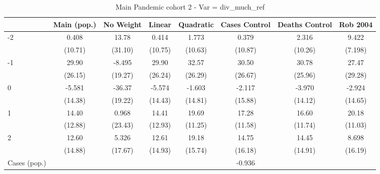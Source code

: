 \documentclass{article}
\begin{document}
{
\def\sym#1{\ifmmode^{#1}\else\(^{#1}\)\fi}
\begin{longtable}{l*{7}{c}}
\caption{Main Pandemic cohort 2 - Var = div\_much\_ref}\\
\hline\hline\endfirsthead\hline\endhead\hline\endfoot\endlastfoot
                &\multicolumn{1}{c}{Main (pop.)}&\multicolumn{1}{c}{No Weight}&\multicolumn{1}{c}{Linear}&\multicolumn{1}{c}{Quadratic}&\multicolumn{1}{c}{Cases Control}&\multicolumn{1}{c}{Deaths Control}&\multicolumn{1}{c}{Rob 2004}\\
\hline
-2              &    0.408         &    13.78         &    0.414         &    1.773         &    0.379         &    2.316         &    9.422         \\
                &  (10.71)         &  (31.10)         &  (10.75)         &  (10.63)         &  (10.87)         &  (10.26)         &  (7.198)         \\
-1              &    29.90         &   -8.495         &    29.90         &    32.57         &    30.50         &    30.78         &    27.47         \\
                &  (26.15)         &  (19.27)         &  (26.24)         &  (26.29)         &  (26.67)         &  (25.96)         &  (29.28)         \\
0               &   -5.581         &   -36.37         &   -5.574         &   -1.603         &   -2.117         &   -3.970         &   -2.924         \\
                &  (14.38)         &  (19.22)         &  (14.43)         &  (14.81)         &  (15.88)         &  (14.12)         &  (14.65)         \\
1               &    14.40         &    0.968         &    14.41         &    19.69         &    17.28         &    16.60         &    20.18         \\
                &  (12.88)         &  (23.43)         &  (12.93)         &  (11.25)         &  (11.58)         &  (11.74)         &  (11.03)         \\
2               &    12.60         &    5.326         &    12.61         &    19.18         &    14.75         &    14.45         &    8.698         \\
                &  (14.88)         &  (17.67)         &  (14.93)         &  (15.74)         &  (16.18)         &  (14.91)         &  (16.19)         \\
Cases (pop.)    &                  &                  &                  &                  &   -0.936         &                  &                  \\

\end{longtable}}
\end{document}
